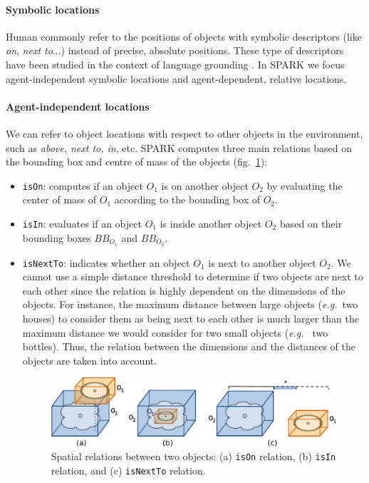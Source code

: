 \documentclass[a4paper]{article}
\newcommand{\eg}{{\textit{e.g.\ }}}
\begin{document}
\paragraph{Symbolic locations}

Human commonly refer to the positions of objects with symbolic descriptors
(like \emph{on}, \emph{next to}...) instead of precise, absolute positions.
These type of descriptors have been studied in the context of language
grounding \cite{O'Keefe1999,Matuszek2010,Regier2001,Kelleher2006,Blisard2005}.
In SPARK we focus agent-independent symbolic locations and agent-dependent,
relative locations.

\paragraph{Agent-independent locations}

We can refer to object locations with respect to other objects in the
environment, such as \emph{above, next to, in}, etc. SPARK computes
three main relations based on the bounding box and centre of mass of the
objects (fig.~\ref{fig|sprelations}): 

\begin{itemize}
	\item \texttt{isOn}: computes if an object $O_1$ is on another object $O_2$ by
	evaluating the center of mass of $O_1$ according to the bounding box of $O_2$.

	\item \texttt{isIn}: evaluates if an object $O_1$ is inside another object
	$O_2$ based on their bounding boxes $BB_{O_1}$ and $BB_{O_2}$.

	\item \texttt{isNextTo}: indicates whether an object $O_1$ is next to another
	object $O_2$. We cannot use a simple distance threshold to determine if two
	objects are next to each other since the relation is highly dependent on the
	dimensions of the objects. For instance, the maximum distance between large
	objects (\eg two houses) to consider them as being next to each other is much
	larger than the maximum distance we would consider for two small objects (\eg
	two bottles). Thus, the relation between the dimensions and the distances of
	the objects are taken into account.  

\begin{figure} 
	\centering
	\includegraphics[width=0.95\columnwidth]{images/spatial_relation.pdf}
	\caption{Spatial relations between two objects: (a) \texttt{isOn} relation, 
	(b) \texttt{isIn} relation, and (c) \texttt{isNextTo} relation.} 
	\label{fig|sprelations} 
\end{figure}

\end{itemize} 
\end{document}

